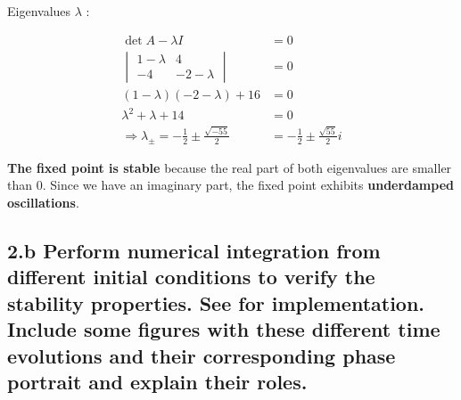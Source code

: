 \documentclass{cmc}
\begin{document}
Eigenvalues $\lambda$ :

\begin{align*}
	\det{A - \lambda I} &= 0 \\
	\begin{vmatrix}
		1 - \lambda & 4 \\ -4 & -2 - \lambda
	\end{vmatrix} &= 0 \\
	(1-\lambda)(-2-\lambda) + 16 &= 0 \\
	\lambda^2 + \lambda + 14 &= 0 \\
	\Rightarrow \lambda_{\pm} = -\frac{1}{2} \pm \frac{\sqrt{-55}}{2} &= -\frac{1}{2} \pm \frac{\sqrt{55}}{2}i
\end{align*}

\textbf{The fixed point is stable} because the real part of both eigenvalues are smaller than 0. Since we have an imaginary part, the fixed point exhibits \textbf{underdamped oscillations}.

\subsection*{2.b Perform numerical integration from different initial conditions
  to verify the stability properties. See 
  for implementation. Include some figures with these different time evolutions
  and their corresponding phase portrait and explain their roles.}
\end{document}
